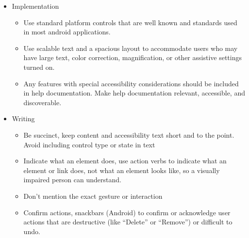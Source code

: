 \begin{itemize}
\begin{itemize}
        \end{itemize}
    \item{Implementation  }
    	\begin{itemize}
        \item{Use standard platform controls that are well known and standards used in most android applications.}
        \item{Use scalable text and a spacious layout to accommodate users who may have large text, color correction, magnification, or other assistive settings turned on.}
        \item{Any features with special accessibility considerations should be included in help documentation. Make help documentation relevant, accessible, and discoverable.}
        \end{itemize}
    \item{Writing}
    	\begin{itemize}
        	\item{Be succinct, keep content and accessibility text short and to the point. Avoid including control type or state in text }
            \item{Indicate what an element does, use action verbs to indicate what an element or link does, not what an element looks like, so a visually impaired person can understand.}
            \item{Don’t mention the exact gesture or interaction}
            \item{Confirm actions, snackbars (Android) to confirm or acknowledge user actions that are destructive (like “Delete” or “Remove”) or difficult to undo. }

        \end{itemize}
   \end{itemize}